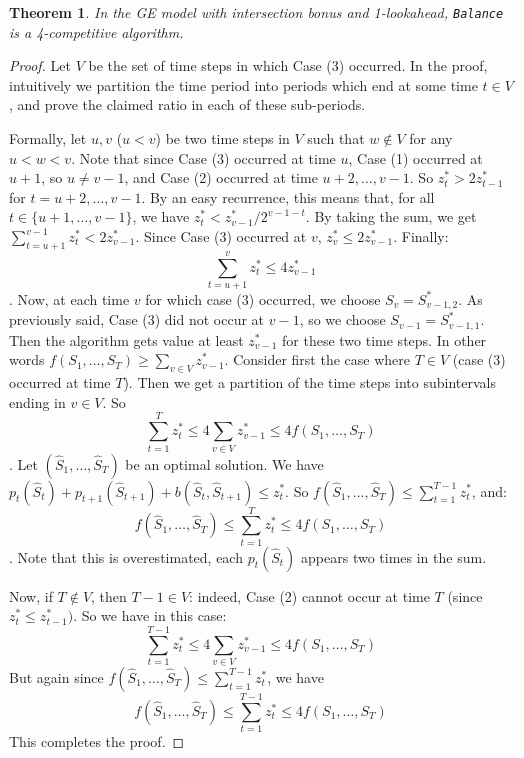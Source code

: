 \documentclass[a4paper]{book}
\newtheorem{theorem}{Theorem}[chapter]
\newtheorem{proof}{\noindent{\bf Proof.} }
\begin{document}
\begin{theorem}\label{thm:general-intersection-upper}
In the GE model with intersection bonus and 1-lookahead, \texttt{Balance} is a 4-competitive algorithm.
\end{theorem}

\begin{proof}
Let $V$ be the set of time steps in which Case (3) occurred. In the proof, intuitively we partition the time period into periods which end at some time $t\in V$, and prove the claimed ratio in each of these sub-periods.

Formally, let $u,v$ ($u<v$) be two time steps in $V$ such that $w\not \in V$ for any $u<w<v$. Note that since Case (3) occurred at time $u$, Case (1) occurred at $u+1$, so $u\neq v-1$, and Case (2) occurred at time $u+2,\dots,v-1$. So $z^*_t>2z^*_{t-1}$ for $t=u+2,\dots,v-1$. By an easy recurrence, this means that, for all $t\in\{u+1,\dots,v-1\}$, we have $z^*_t< z^*_{v-1}/2^{v-1-t}$. By taking the sum, we get $\sum_{t=u+1}^{v-1}z^*_t < 2 z^*_{v-1}$. Since Case (3) occurred at $v$, $z^*_v\leq 2z^*_{v-1}$. Finally:
\[\sum_{t=u+1}^{v}z^*_t\leq 4 z^*_{v-1}\].
Now, at each time $v$ for which case (3) occurred, we choose $S_v=S^*_{v-1,2}$. As previously said, Case (3) did not occur at $v-1$, so we choose $S_{v-1}=S^*_{v-1,1}$. Then the algorithm gets value at least $z^*_{v-1}$ for these two time steps. In other words
$f(S_1,\dots,S_T)\geq \sum_{v\in V} z^*_{v-1}$.
Consider first the case where $T\in V$ (case (3) occurred at time $T$). Then we get a partition of the time steps into subintervals ending in $v\in V$. So
\[\sum_{t=1}^{T}z^*_t\leq 4 \sum_{v\in V}z^*_{v-1}\leq 4 f(S_1,\dots,S_T)\].
Let $(\hat{S}_1,\dots,\hat{S}_T)$ be an optimal solution. We have $p_t(\hat{S}_t)+p_{t+1}(\hat{S}_{t+1})+b(\hat{S}_t,\hat{S}_{t+1})\leq z^*_t$. So $f(\hat{S}_1,\dots,\hat{S}_T)\leq \sum_{t=1}^{T-1}z^*_t$, and:
\[f(\hat{S}_1,\dots,\hat{S}_T)\leq  \sum_{t=1}^{T}z^*_t \leq 4 f(S_1,\dots,S_T)\].
Note that this is overestimated, each $p_t(\hat{S}_t)$ appears two times in the sum.

Now, if $T\not\in V$, then $T-1\in V$: indeed, Case (2) cannot occur at time $T$ (since $z^*_t\leq z^*_{t-1})$. So we have in this case:
\[\sum_{t=1}^{T-1}z^*_t\leq 4 \sum_{v\in V}z^*_{v-1}\leq 4 f(S_1,\dots,S_T)\]
But again since $f(\hat{S}_1,\dots,\hat{S}_T)\leq \sum_{t=1}^{T-1}z^*_t$, we have 
\[f(\hat{S}_1,\dots,\hat{S}_T)\leq  \sum_{t=1}^{T-1}z^*_t \leq 4 f(S_1,\dots,S_T)\] This completes the proof. %
\end{proof}
\end{document}
